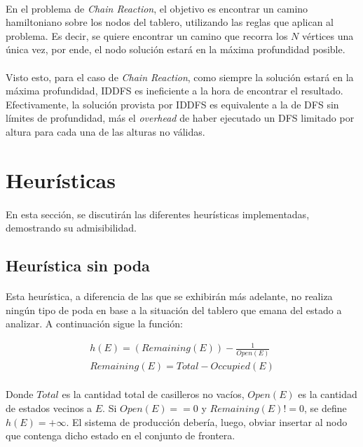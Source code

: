 \documentclass[12pt, twocolumn]{article}
\begin{document}
	\paragraph{} En el problema de \textit{Chain Reaction}, el objetivo es encontrar un camino hamiltoniano sobre los nodos del tablero, utilizando las reglas que aplican al problema. Es decir, se quiere encontrar un camino que recorra los $N$ vértices una única vez, por ende, el nodo solución estará en la máxima profundidad posible.
	
	\paragraph{} Visto esto, para el caso de \textit{Chain Reaction}, como siempre la solución estará en la máxima profundidad, IDDFS es ineficiente a la hora de encontrar el resultado. Efectivamente, la solución provista por IDDFS es equivalente a la de DFS sin límites de profundidad, más el \textit{overhead} de haber ejecutado un DFS limitado por altura para cada una de las alturas no válidas.
	
	\section{Heurísticas}
	
	\paragraph{} En esta sección, se discutirán las diferentes heurísticas implementadas, demostrando su admisibilidad.
	
	\subsection{Heurística sin poda}
	
	\paragraph{} Esta heurística, a diferencia de las que se exhibirán más adelante, no realiza ningún tipo de poda en base a la situación del tablero que emana del estado a analizar. A continuación sigue la función:
	
	\begin{align}
		h(E) = (Remaining(E))-\frac{1}{Open(E)} \\
		Remaining(E) = Total-Occupied(E)
	\end{align}
	
	\paragraph{} Donde $Total$ es la cantidad total de casilleros no vacíos, $Open(E)$ es la cantidad de estados vecinos a $E$. Si $Open(E) == 0$ y $Remaining(E) != 0$, se define $h(E) = +\infty$. El sistema de producción debería, luego, obviar insertar al nodo que contenga dicho estado en el conjunto de frontera.
	
\end{document}
